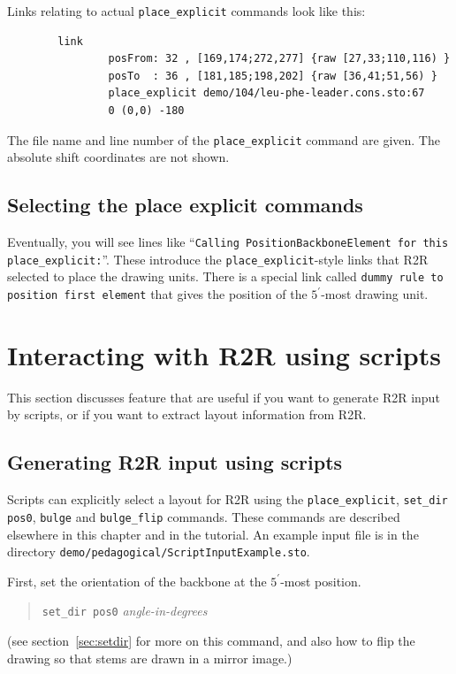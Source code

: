 \documentclass[letterpaper,12pt]{report}
\newcommand{\example}[1]{
\begin{quote}
{\raggedright
#1
}
\end{quote}
}
\begin{document}
Links relating to actual {\tt place\_explicit} commands look like this:
\begin{verbatim}
        link
                posFrom: 32 , [169,174;272,277] {raw [27,33;110,116) }
                posTo  : 36 , [181,185;198,202] {raw [36,41;51,56) }
                place_explicit demo/104/leu-phe-leader.cons.sto:67
                0 (0,0) -180
\end{verbatim}
The file name and line number of the {\tt place\_explicit} command are given.
The absolute shift coordinates are not shown.

\subsection{Selecting the place explicit commands}

Eventually, you will see lines like ``{\tt Calling PositionBackboneElement for this place\_explicit:}''.
These introduce the {\tt place\_explicit}-style links that R2R selected
to place the drawing units.
There is a special link called {\tt dummy rule to position first element}
that gives the position of the $5^\prime$-most drawing unit.

\section{Interacting with R2R using scripts}
\label{scriptedInteraction}

This section discusses feature that are useful if you want to generate R2R input by scripts, or if you want to extract layout information from R2R.

\subsection{Generating R2R input using scripts}

Scripts can explicitly select a layout for R2R using the {\tt place\_explicit}, {\tt set\_dir pos0}, {\tt bulge} and {\tt bulge\_flip} commands.  These commands are described elsewhere in this chapter and in the tutorial.  An example input file is in the directory {\tt demo/pedagogical/ScriptInputExample.sto}.

First, set the orientation of the backbone at the $5^\prime$-most position.
\example{
{\tt set\_dir pos0} {\it angle-in-degrees}
}
(see section~\ref{sec:setdir} for more on this command, and also how to flip the drawing so that stems are drawn in a mirror image.)
\end{document}
